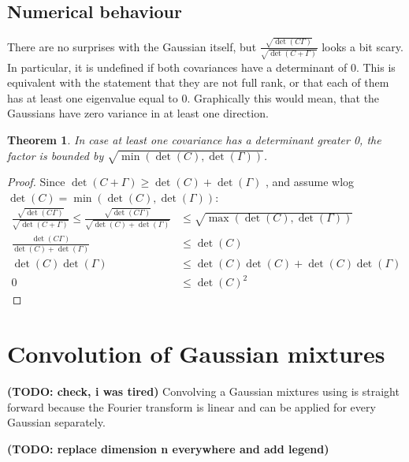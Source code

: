 \documentclass{paper}
\newtheorem{theorem}{Theorem}
\newcommand{\todo}[1]{{\color{red}\textbf{(TODO: {#1})}}} %
\newcommand{\f}[1]{\operatorname{#1}}
\begin{document}
\subsection{Numerical behaviour}
There are no surprises with the Gaussian itself, but $\frac{\sqrt{\f{det}(C\Gamma)}}{\sqrt{\f{det}(C+\Gamma)}}$ looks a bit scary.
In particular, it is undefined if both covariances have a determinant of 0.
This is equivalent with the statement that they are not full rank, or that each of them has at least one eigenvalue equal to 0.
Graphically this would mean, that the Gaussians have zero variance in at least one direction.

\begin{theorem}
	In case at least one covariance has a determinant greater 0, the factor is bounded by $\sqrt{\f{min}(\f{det}(C), \f{det}(\Gamma))}$.
\end{theorem}
\begin{proof}
Since $\f{det}(C+\Gamma) \ge \f{det}(C) + \f{det}(\Gamma)$ \cite{wiki_det_inequalities}, and assume wlog $\f{det}(C) = \f{min}(\f{det}(C), \f{det}(\Gamma))$:
\begin{align*}
	\frac{\sqrt{\f{det}(C\Gamma)}}{\sqrt{\f{det}(C+\Gamma)}} \le \frac{\sqrt{\f{det}(C\Gamma)}}{\sqrt{\f{det}(C) + \f{det}(\Gamma)}} &\le \sqrt{\f{max}(\f{det}(C), \f{det}(\Gamma))} \\
	\frac{\f{det}(C\Gamma)}{\f{det}(C) + \f{det}(\Gamma)} &\le \f{det}(C) \\
	\f{det}(C)\f{det}(\Gamma) &\le \f{det}(C)\f{det}(C) + \f{det}(C)\f{det}(\Gamma) \\
	0 &\le \f{det}(C)^2
\end{align*}
\end{proof}

\section{Convolution of Gaussian mixtures}
\todo{check, i was tired}
Convolving a Gaussian mixtures using is straight forward because the Fourier transform is linear and can be applied for every Gaussian separately.

\todo{replace dimension n everywhere and add legend}
\end{document}
